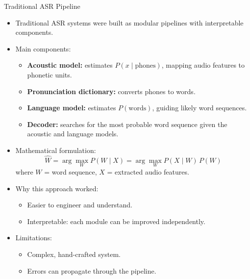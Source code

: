 \begin{frame}[allowframebreaks]{Traditional ASR Pipeline}

\begin{itemize}
    \item Traditional ASR systems were built as modular pipelines with interpretable components.  
    \item Main components:
    \begin{itemize}
        \item \textbf{Acoustic model:} estimates $P(x \mid \text{phones})$, mapping audio features to phonetic units.
        \item \textbf{Pronunciation dictionary:} converts phones to words.
        \item \textbf{Language model:} estimates $P(\text{words})$, guiding likely word sequences.
        \item \textbf{Decoder:} searches for the most probable word sequence given the acoustic and language models.
    \end{itemize}

    \item Mathematical formulation:
    \[
        \hat{W} = \arg\max_W P(W \mid X) = \arg\max_W P(X \mid W) \, P(W)
    \]
    where $W$ = word sequence, $X$ = extracted audio features.

    \item Why this approach worked:
    \begin{itemize}
        \item Easier to engineer and understand.
        \item Interpretable: each module can be improved independently.
    \end{itemize}

    \item Limitations:
    \begin{itemize}
        \item Complex, hand-crafted system.
        \item Errors can propagate through the pipeline.
    \end{itemize}
\end{itemize}

\end{frame}


